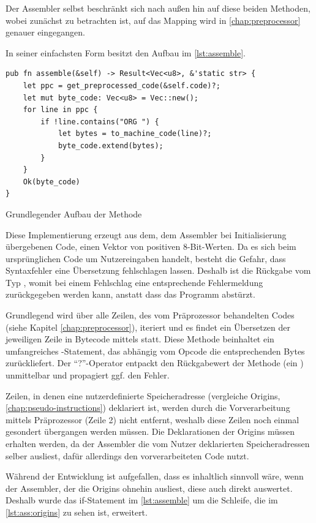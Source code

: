 Der Assembler selbst beschränkt sich nach außen hin auf diese beiden Methoden, wobei zunächst  zu betrachten ist, auf das Mapping wird in \ref{chap:preprocessor} genauer eingegangen.

In seiner einfachsten Form besitzt  den Aufbau im \cref{lst:assemble}.

\begin{listing}[ht]
\begin{verbatim}
pub fn assemble(&self) -> Result<Vec<u8>, &'static str> {
    let ppc = get_preprocessed_code(&self.code)?;
    let mut byte_code: Vec<u8> = Vec::new();
    for line in ppc {
        if !line.contains("ORG ") {
            let bytes = to_machine_code(line)?;
            byte_code.extend(bytes);
        }
    }
    Ok(byte_code)
}
\end{verbatim}
\label{lst:assemble}
\caption{Grundlegender Aufbau der Methode }
\end{listing}

Diese Implementierung erzeugt aus dem, dem Assembler bei Initialisierung übergebenen Code, einen Vektor von positiven 8-Bit-Werten. Da es sich beim ursprünglichen Code um Nutzereingaben handelt, besteht die Gefahr, dass Syntaxfehler eine Übersetzung fehlschlagen lassen. Deshalb ist die Rückgabe vom Typ , womit bei einem Fehlschlag eine entsprechende Fehlermeldung zurückgegeben werden kann, anstatt dass das Programm abstürzt.

Grundlegend wird über alle Zeilen, des vom Präprozessor behandelten Codes (siehe Kapitel \ref{chap:preprocessor}), iteriert und es findet ein Übersetzen der jeweiligen Zeile in Bytecode mittels  statt. Diese Methode beinhaltet ein umfangreiches -Statement, das abhängig vom Opcode die entsprechenden Bytes zurückliefert. Der \enquote{?}-Operator entpackt den Rückgabewert der Methode (ein ) unmittelbar und propagiert ggf. den Fehler.

Zeilen, in denen eine nutzerdefinierte Speicheradresse (vergleiche Origins, \ref{chap:pseudo-instructions}) deklariert ist, werden durch die Vorverarbeitung mittels Präprozessor (Zeile 2) nicht entfernt, weshalb diese Zeilen noch einmal gesondert übergangen werden müssen. Die Deklarationen der Origins müssen erhalten werden, da der Assembler die vom Nutzer deklarierten Speicheradressen selber ausliest, dafür allerdings den vorverarbeiteten Code nutzt.

Während der Entwicklung ist aufgefallen, dass es inhaltlich sinnvoll wäre, wenn der Assembler, der die Origins ohnehin ausliest, diese auch direkt auswertet. Deshalb wurde das if-Statement im \cref{lst:assemble} um die Schleife, die im \cref{lst:ass:origins} zu sehen ist, erweitert.

